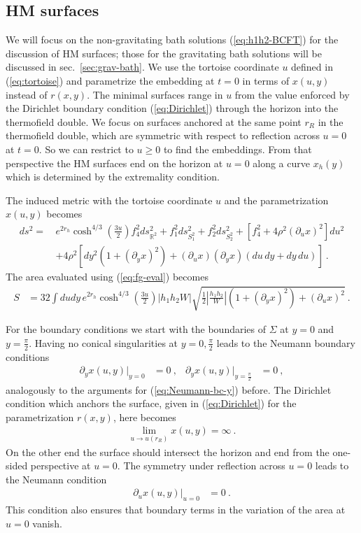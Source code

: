 \documentclass[aps,prd,11pt,notitlepage,longbibliography,nofootinbib,tightenlines,preprintnumbers]{revtex4-1}
\begin{document}
\subsection{HM surfaces}

We will focus on the non-gravitating bath solutions (\ref{eq:h1h2-BCFT}) for the discussion of HM surfaces; those for the gravitating bath solutions will be discussed in sec.~\ref{sec:grav-bath}.
%
We use the tortoise coordinate $u$ defined in (\ref{eq:tortoise}) and parametrize the embedding at $t=0$ in terms of $x(u,y)$ instead of $r(x,y)$.
The minimal surfaces range in $u$ from the value enforced by the Dirichlet boundary condition (\ref{eq:Dirichlet}) through the horizon into the thermofield double.
We focus on surfaces anchored at the same point $r_R$ in the thermofield double, which are symmetric with respect to reflection across $u=0$ at $t=0$.
So we can restrict to $u\geq 0$ to find the embeddings.
From that perspective the HM surfaces end on the horizon at $u=0$ along a curve $x_h(y)$ which is determined by the extremality condition.

The induced metric with the tortoise coordinate $u$ and the parametrization $x(u,y)$ becomes 
\begin{align}
	ds^2=\,&e^{2r_h}\cosh^{4/3}\left(\frac{3u}{2}\right)f_4^2ds^2_{\mathds{R}^2}+f_1^2 ds^2_{S_1^2}+f_2^2ds^2_{S_2^2}+
	\left[f_4^2+4\rho^2(\partial_u x)^2\right]du^2
	\nonumber\\ &
	+4\rho^2 \left[dy^2\left(1+(\partial_y x)^2\right)+(\partial_u x)(\partial_y x)(du\, dy+dy\,du)\right]~.
\end{align}
The area evaluated using (\ref{eq:fg-eval}) becomes
\begin{align}\label{eq:HM-area}
	S&=32\int du dy\, e^{2r_h}\cosh^{4/3}\left(\frac{3u}{2}\right)|h_1 h_2W|\sqrt{\frac{1}{2}\left|\frac{h_1 h_2}{W}\right|\left(1+(\partial_y x)^2\right)+(\partial_u x)^2}~.
\end{align}


For the boundary conditions we start with the boundaries of $\Sigma$ at $y=0$ and $y=\frac{\pi}{2}$.
Having no conical singularities at $y=0,\frac{\pi}{2}$ leads to the Neumann boundary conditions
\begin{align}\label{eq:Neumann-bc-y-HM}
	\partial_y x(u,y)\big\vert_{y=0}&=0~, &\partial_y x(u,y)\big\vert_{y=\frac{\pi}{2}}&=0~,
\end{align}
analogously to the arguments for  (\ref{eq:Neumann-bc-y}) before.
%
The Dirichlet condition which anchors the surface, given in (\ref{eq:Dirichlet}) for the parametrization $r(x,y)$, here becomes
\begin{align}
	\lim_{u\rightarrow u(r_R)} x(u,y)=\infty~.
\end{align}
On the other end the surface should intersect the horizon and end from the one-sided perspective at $u=0$.
The symmetry under reflection across $u=0$ leads to the Neumann condition
\begin{align}
	\partial_u x(u,y)\vert_{u=0}&=0~.
\end{align}
This condition also ensures that boundary terms in the variation of the area  at $u=0$ vanish. 
\end{document}
